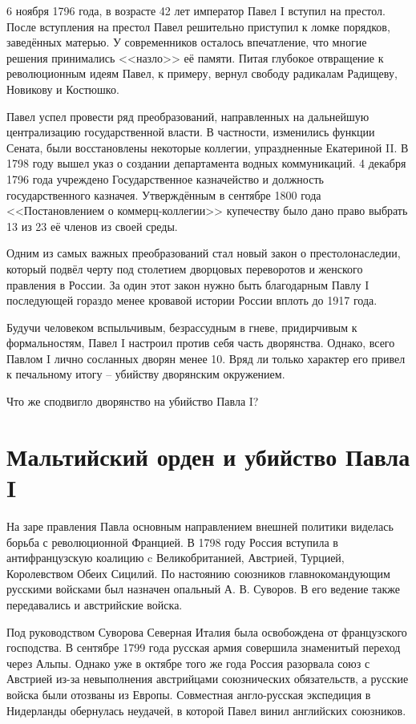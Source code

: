 \documentclass[a4paper,12pt]{diss_4}
\begin{document}
6 ноября 1796 года, в возрасте 42 лет император Павел I вступил на престол. После вступления на престол Павел решительно приступил к ломке порядков, заведённых матерью. У современников осталось впечатление, что многие решения принимались <<назло>> её памяти. Питая глубокое отвращение к революционным идеям Павел, к примеру, вернул свободу радикалам Радищеву, Новикову и Костюшко.

Павел успел провести ряд преобразований, направленных на дальнейшую централизацию государственной власти. В частности, изменились функции Сената, были восстановлены некоторые коллегии, упраздненные Екатериной II. В 1798 году вышел указ о создании департамента водных коммуникаций. 4 декабря 1796 года учреждено Государственное казначейство и должность государственного казначея. Утверждённым в сентябре 1800 года <<Постановлением о коммерц-коллегии>> купечеству было дано право выбрать 13 из 23 её членов из своей среды.

Одним из самых важных преобразований стал новый закон о престолонаследии, который подвёл черту под столетием дворцовых переворотов и женского правления в России. За один этот закон нужно быть благодарным Павлу I последующей гораздо менее кровавой истории России вплоть до 1917 года.


Будучи человеком вспыльчивым, безрассудным в гневе, придирчивым к формальностям, Павел I настроил против себя часть дворянства. Однако, всего Павлом I лично сосланных дворян менее 10. Вряд ли только характер его привел к печальному итогу -- убийству дворянским окружением.

Что же сподвигло дворянство на убийство Павла I?

\chapter{Мальтийский орден и убийство Павла I}

На заре правления Павла основным направлением внешней политики виделась борьба с революционной Францией. В 1798 году Россия вступила в антифранцузскую коалицию c Великобританией, Австрией, Турцией, Королевством Обеих Сицилий. По настоянию союзников главнокомандующим русскими войсками был назначен опальный А. В. Суворов. В его ведение также передавались и австрийские войска.

Под руководством Суворова Северная Италия была освобождена от французского господства. В сентябре 1799 года русская армия совершила знаменитый переход через Альпы. Однако уже в октябре того же года Россия разорвала союз с Австрией из-за невыполнения австрийцами союзнических обязательств, а русские войска были отозваны из Европы. Совместная англо-русская экспедиция в Нидерланды обернулась неудачей, в которой Павел винил английских союзников.
\end{document}
